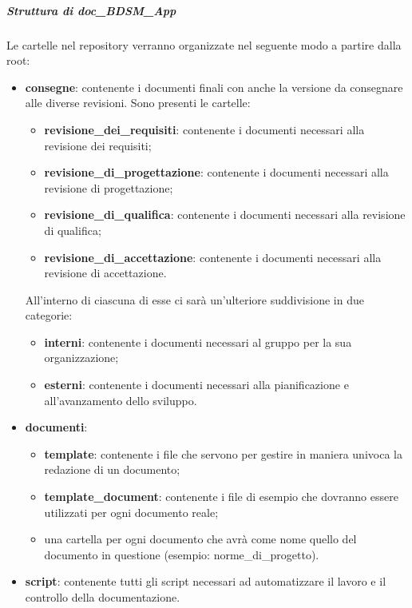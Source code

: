 				\subparagraph{Struttura di doc\_BDSM\_App}
				Le cartelle nel repository\gloss{} verranno organizzate nel seguente modo a partire dalla root:
					\begin{itemize}
						\item \textbf{consegne}: contenente i documenti finali con anche la versione da consegnare alle diverse revisioni. Sono presenti le cartelle:
							\begin{itemize}
								\item \textbf{revisione\_dei\_requisiti}: contenente i documenti necessari alla revisione dei requisiti;
								\item \textbf{revisione\_di\_progettazione}: contenente i documenti necessari alla revisione di progettazione;
								\item \textbf{revisione\_di\_qualifica}: contenente i documenti necessari alla revisione di qualifica;
								\item \textbf{revisione\_di\_accettazione}: contenente i documenti necessari alla revisione di accettazione.
							\end{itemize}
						\noindent
						All'interno di ciascuna di esse ci sarà un'ulteriore suddivisione in due categorie:
							\begin{itemize}
								\item \textbf{interni}: contenente i documenti necessari al gruppo per la sua organizzazione;
								\item \textbf{esterni}: contenente i documenti necessari alla pianificazione e all'avanzamento dello sviluppo.
							\end{itemize}
							
						\item \textbf{documenti}:
							\begin{itemize}
								\item \textbf{template\gloss{}}: contenente i file che servono per gestire in maniera univoca la redazione di un documento;
								\item \textbf{template\gloss{}\_document}: contenente i file di esempio che dovranno essere utilizzati per ogni documento reale;
								\item una cartella per ogni documento che avrà come nome quello del documento in questione (esempio: norme\_di\_progetto).
							\end{itemize}
							
						\item \textbf{script}: contenente tutti gli script necessari ad automatizzare il lavoro e il controllo della documentazione.
					\end{itemize}
					
